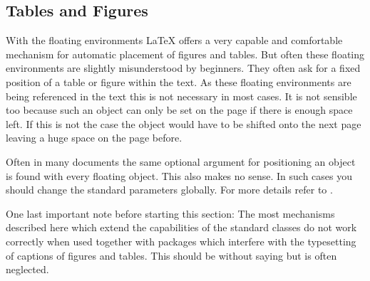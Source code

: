 \subsection{Tables and Figures}
\label{sec:maincls.floats}

\begin{Explain}
  With the floating environments {\LaTeX} offers a very capable and
  comfortable mechanism for automatic placement of
  figures and tables. But often these
  floating environments are
  slightly misunderstood by beginners. They often ask for a fixed
  position of a table or figure within the text. As these floating
  environments are being referenced in the text this is not necessary
  in most cases. It is not sensible too because such an object can
  only be set on the page if there is enough space left. If this is
  not the case the object would have to be shifted onto the next page
  leaving a huge space on the page before.
  

  Often in many documents the same optional argument for positioning
  an object is found with every floating object. This also makes no
  sense. In such cases you should change the standard parameters
  globally. For more details refer to \cite{DANTE:FAQ}.\par
\end{Explain}

One last important note before starting this section: The most
mechanisms described here which extend the capabilities of the
standard classes do not work correctly when used together with
packages which interfere with the typesetting of captions of figures
and tables. This should be without saying but is often neglected.

